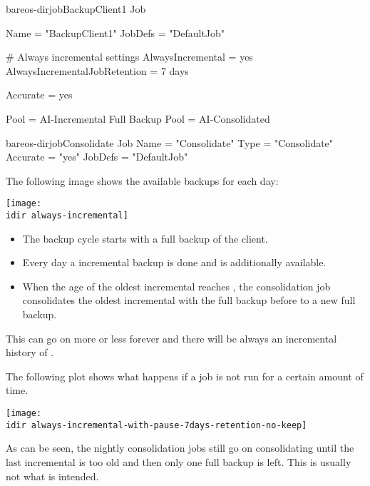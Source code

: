 \begin{bareosConfigResource}{bareos-dir}{job}{BackupClient1}
Job {
    Name = "BackupClient1"
    JobDefs = "DefaultJob"

    # Always incremental settings
    AlwaysIncremental = yes
    AlwaysIncrementalJobRetention = 7 days

    Accurate = yes

    Pool = AI-Incremental
    Full Backup Pool = AI-Consolidated
}
\end{bareosConfigResource}

\begin{bareosConfigResource}{bareos-dir}{job}{Consolidate}
Job {
    Name = "Consolidate"
    Type = "Consolidate"
    Accurate = "yes"
    JobDefs = "DefaultJob"
}
\end{bareosConfigResource}



The following image shows the available backups for each day:

\begin{center}
\texttt{[image: \\idir always-incremental]}
\end{center}


\begin{itemize}
    \item The backup cycle starts with a full backup of the client. 
    \item Every day a incremental backup is done and is additionally available.
    \item When the age of the oldest incremental reaches , the consolidation job consolidates the oldest incremental with the full backup before to a new full backup.
\end{itemize}

This can go on more or less forever and there will be always an incremental history of .

The following plot shows what happens if a job is not run for a certain amount of time.

\begin{center}
\texttt{[image: \\idir always-incremental-with-pause-7days-retention-no-keep]}
\end{center}

As can be seen, the nightly consolidation jobs still go on consolidating until the last incremental is too old and then only one full backup is left. This is usually not what is intended.

